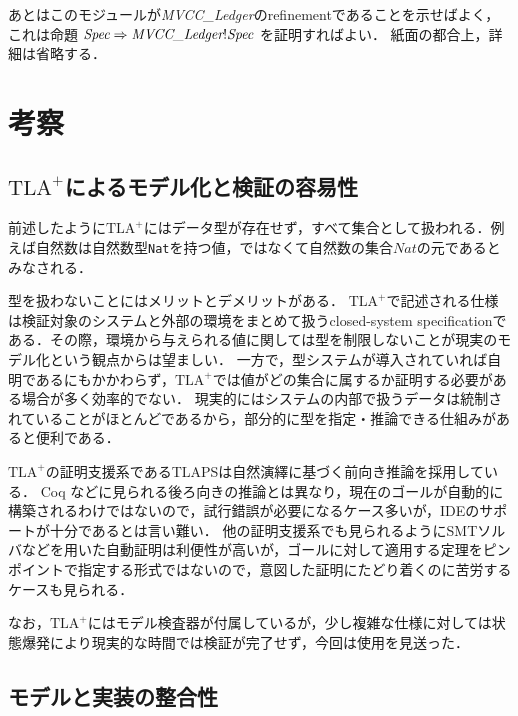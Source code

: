 \documentclass{fose2019}           %
\newcommand{\TLA}{$\text{TLA}^{+}$}
\begin{document}
あとはこのモジュールが\textit{MVCC\_Ledger}のrefinementであることを示せばよく，これは命題 $\textit{Spec} \Rightarrow \textit{MVCC\_Ledger}!\textit{Spec}$ を証明すればよい．
紙面の都合上，詳細は省略する．

\section{考察}
\label{sec:consider}

\subsection{\TLA によるモデル化と検証の容易性}
前述したように\TLA にはデータ型が存在せず，すべて集合として扱われる．例えば自然数は自然数型\texttt{Nat}を持つ値，ではなくて自然数の集合$\mathit{Nat}$の元であるとみなされる．

型を扱わないことにはメリットとデメリットがある．
\TLA で記述される仕様は検証対象のシステムと外部の環境をまとめて扱うclosed-system specificationである．その際，環境から与えられる値に関しては型を制限しないことが現実のモデル化という観点からは望ましい．
一方で，型システムが導入されていれば自明であるにもかかわらず，\TLA では値がどの集合に属するか証明する必要がある場合が多く効率的でない．
現実的にはシステムの内部で扱うデータは統制されていることがほとんどであるから，部分的に型を指定・推論できる仕組みがあると便利である．

\TLA の証明支援系であるTLAPSは自然演繹に基づく前向き推論を採用している．
Coq などに見られる後ろ向きの推論とは異なり，現在のゴールが自動的に構築されるわけではないので，試行錯誤が必要になるケース多いが，IDEのサポートが十分であるとは言い難い．
他の証明支援系でも見られるようにSMTソルバなどを用いた自動証明は利便性が高いが，ゴールに対して適用する定理をピンポイントで指定する形式ではないので，意図した証明にたどり着くのに苦労するケースも見られる．

なお，\TLA にはモデル検査器が付属しているが，少し複雑な仕様に対しては状態爆発により現実的な時間では検証が完了せず，今回は使用を見送った．

\subsection{モデルと実装の整合性}
\end{document}
